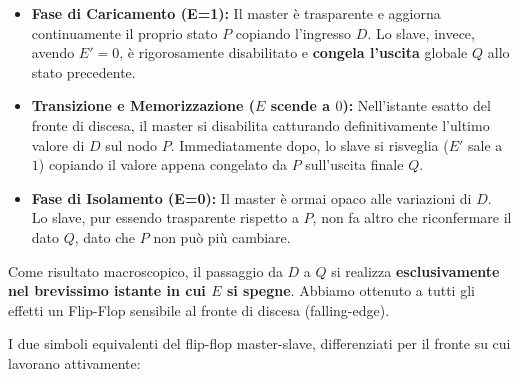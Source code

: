 \documentclass[11pt,a4paper]{report}
\begin{document}
\begin{itemize}[leftmargin=1.5em,itemsep=4pt]
  \item \textbf{Fase di Caricamento (E=1):} Il master è trasparente e aggiorna continuamente il proprio stato $P$ copiando l'ingresso $D$. Lo slave, invece, avendo $E'=0$, è rigorosamente disabilitato e \textbf{congela l'uscita} globale $Q$ allo stato precedente.
  \item \textbf{Transizione e Memorizzazione ($E$ scende a $0$):} Nell'istante esatto del fronte di discesa, il master si disabilita catturando definitivamente l'ultimo valore di $D$ sul nodo $P$. Immediatamente dopo, lo slave si risveglia ($E'$ sale a $1$) copiando il valore appena congelato da $P$ sull'uscita finale $Q$.
  \item \textbf{Fase di Isolamento (E=0):} Il master è ormai opaco alle variazioni di $D$. Lo slave, pur essendo trasparente rispetto a $P$, non fa altro che riconfermare il dato $Q$, dato che $P$ non può più cambiare.
\end{itemize}

Come risultato macroscopico, il passaggio da $D$ a $Q$ si realizza \textbf{esclusivamente nel brevissimo istante in cui $E$ si spegne}. Abbiamo ottenuto a tutti gli effetti un Flip-Flop sensibile al fronte di discesa (falling-edge).

\noindent I due simboli equivalenti del flip-flop master-slave, differenziati per il fronte su cui lavorano attivamente:

\begin{center}
\end{center}
\end{document}

